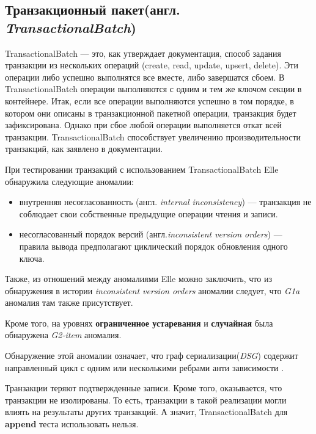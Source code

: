 \documentclass[14pt,  openany]{book}
\begin{document}
\subsection{Транзакционный пакет(англ. \textit{TransactionalBatch})}
TransactionalBatch --- это, как утверждает документация, способ задания транзакции из нескольких операций (create, read, update, upsert, delete). Эти операции либо успешно выполнятся все вместе, либо завершатся сбоем.  В TransactionalBatch операции выполняются с одним и тем же ключом секции в контейнере.  Итак, если все операции выполняются успешно в том порядке, в котором они описаны в транзакционной пакетной операции, транзакция будет зафиксирована. Однако при сбое любой операции выполняется откат всей транзакции. TransactionalBatch способствует увеличению производительности транзакций, как заявлено в документации.
\par При тестировании транзакций с использованием TransactionalBatch Elle обнаружила следующие аномалии:
\begin{itemize}
\item внутренняя несогласованность (англ. \textit{internal inconsistency}) --- транзакция не соблюдает свои собственные предыдущие операции чтения и записи.
\item несогласованный порядок версий (англ.\textit{inconsistent version orders}) --- правила вывода предполагают циклический порядок обновления одного ключа.
\end{itemize}
Также, из отношений между аномалиями Elle\cite{Kingsbury2020ElleII} можно заключить, что из обнаружения в истории  \textit{inconsistent version orders} аномалии следует, что \textit{G1a} аномалия там также присутствует.
\par Кроме того, на уровнях \textbf{ограниченное устаревания} и \textbf{случайная} была обнаружена \textit{G2-item} аномалия. 
\par Обнаружение этой аномалии означает, что граф сериализации(\textit{DSG}) содержит направленный цикл с одним или несколькими ребрами анти зависимости \cite{IsolationLevelDefinitions}.
\par Транзакции теряют подтвержденные записи.  Кроме того, оказывается, что транзакции не изолированы. То есть, транзакции в такой реализации могли влиять на результаты других транзакций.
А значит, TransactionalBatch для \textbf{append} теста использовать нельзя.
\end{document}
